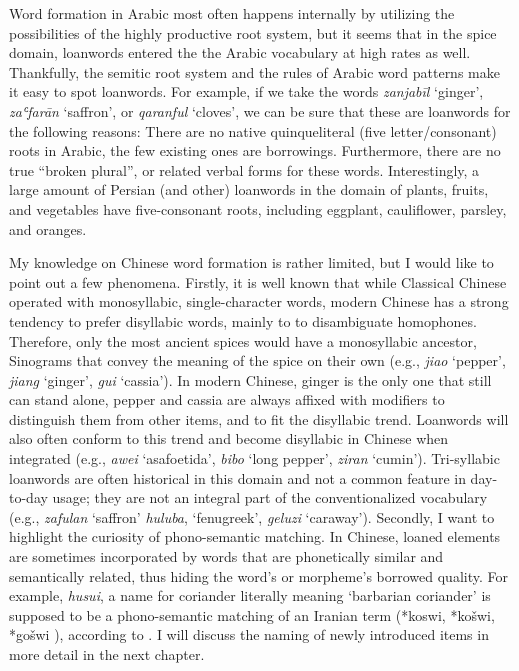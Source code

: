 Word formation in Arabic most often happens internally by utilizing the possibilities of the highly productive root system, but it seems that in the spice domain, loanwords entered the the Arabic vocabulary at high rates as well. Thankfully, the semitic root system and the rules of Arabic word patterns make it easy to spot loanwords. For example, if we take the words \textit{zanjabīl} `ginger', \textit{zaʿfarān} `saffron', or \textit{qaranful} `cloves', we can be sure that these are loanwords for the following reasons: There are no native quinqueliteral (five letter/consonant) roots in Arabic, the few existing ones are borrowings. Furthermore, there are no true ``broken plural'', or related verbal forms for these words. Interestingly, a large amount of Persian (and other) loanwords in the domain of plants, fruits, and vegetables have five-consonant roots, including eggplant, cauliflower, parsley, and oranges.

My knowledge on Chinese word formation is rather limited, but I would like to point out a few phenomena. Firstly, it is well known that while Classical Chinese operated with monosyllabic, single-character words, modern Chinese has a strong tendency to prefer disyllabic words, mainly to to disambiguate homophones. Therefore, only the most ancient spices would have a monosyllabic ancestor, Sinograms that convey the meaning of the spice on their own (e.g., \textit{jiao} `pepper', \textit{jiang} `ginger', \textit{gui} `cassia'). In modern Chinese, ginger is the only one that still can stand alone, pepper and cassia are always affixed with modifiers to distinguish them from other items, and to fit the disyllabic trend. Loanwords will also often conform to this trend and become disyllabic in Chinese when integrated (e.g., \textit{awei} `asafoetida', \textit{bibo} `long pepper', \textit{ziran} `cumin'). Tri-syllabic loanwords are often historical in this domain and not a common feature in day-to-day usage; they are not an integral part of the conventionalized vocabulary (e.g., \textit{zafulan} `saffron' \textit{huluba}, `fenugreek', \textit{geluzi} `caraway'). Secondly, I want to highlight the curiosity of phono-semantic matching. In Chinese, loaned elements are sometimes incorporated by words that are phonetically similar and semantically related, thus hiding the word's or morpheme's borrowed quality. For example, \textit{husui}, a name for coriander literally meaning `barbarian coriander' is supposed to be a phono-semantic matching of an Iranian term (*koswi, *košwi, *gošwi
), according to \textcite{laufer_sino-iranica_1919}.  
I will discuss the naming of newly introduced items in more detail in the next chapter.

